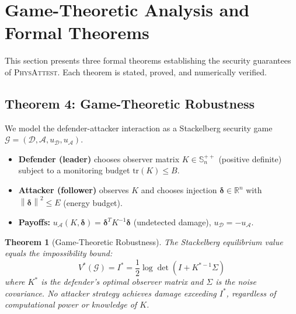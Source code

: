 \documentclass[journal]{IEEEtran}
\newtheorem{theorem}{Theorem}
\newcommand{\physattest}{\textsc{PhysAttest}}
\newcommand{\norm}[1]{\left\|#1\right\|}
\newcommand{\R}{\mathbb{R}}
\begin{document}
\section{Game-Theoretic Analysis and Formal Theorems}
\label{sec:game_theory}

This section presents three formal theorems establishing the security guarantees of \physattest{}. Each theorem is stated, proved, and numerically verified.

\subsection{Theorem 4: Game-Theoretic Robustness}

We model the defender-attacker interaction as a Stackelberg security game $\mathcal{G} = (\mathcal{D}, \mathcal{A}, u_{\mathcal{D}}, u_{\mathcal{A}})$.

\begin{itemize}[leftmargin=*]
\item \textbf{Defender (leader)} chooses observer matrix $K \in \mathbb{S}^{++}_n$ (positive definite) subject to a monitoring budget $\text{tr}(K) \le B$.
\item \textbf{Attacker (follower)} observes $K$ and chooses injection $\bm{\delta} \in \R^n$ with $\norm{\bm{\delta}}^2 \le E$ (energy budget).
\item \textbf{Payoffs:} $u_{\mathcal{A}}(K, \bm{\delta}) = \bm{\delta}^T K^{-1} \bm{\delta}$ (undetected damage), $u_{\mathcal{D}} = -u_{\mathcal{A}}$.
\end{itemize}

\begin{theorem}[Game-Theoretic Robustness]
\label{thm:stackelberg}
The Stackelberg equilibrium value equals the impossibility bound:
\begin{equation}
  V^*(\mathcal{G}) = I^* = \frac{1}{2} \log \det\!\left(I + K^{*-1} \Sigma\right)
  \label{eq:impossibility}
\end{equation}
where $K^*$ is the defender's optimal observer matrix and $\Sigma$ is the noise covariance. No attacker strategy achieves damage exceeding $I^*$, regardless of computational power or knowledge of $K$.
\end{theorem}
\end{document}
